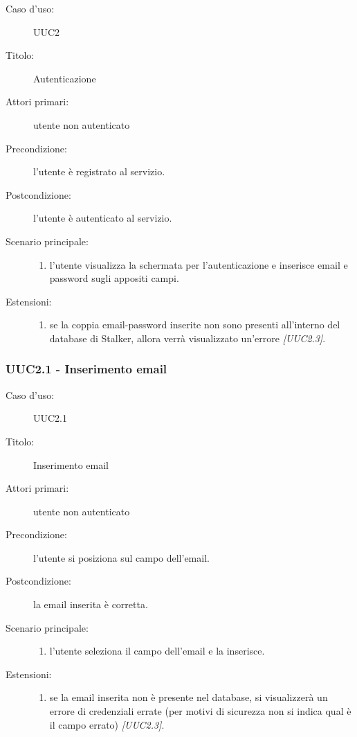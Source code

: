 \documentclass[../analisi-dei-requisiti.tex]{subfiles}
\begin{document}
\begin{description}
  \item[Caso d’uso:] UUC2
  \item[Titolo:] Autenticazione
  \item[Attori primari:] utente non autenticato
  \item[Precondizione:] l'utente è registrato al servizio.
  \item[Postcondizione:] l'utente è autenticato al servizio.
  \item[Scenario principale:]
  \begin{enumerate}
    \item l'utente visualizza la schermata per l'autenticazione e inserisce email e password sugli appositi campi.
  \end{enumerate}
  \item[Estensioni:]
  \begin{enumerate}
    \item se la coppia email-password inserite non sono presenti all'interno del database di Stalker, allora verrà visualizzato un'errore \emph{[UUC2.3]}.
  \end{enumerate}
\end{description}

\subsubsection{UUC2.1 - Inserimento email}%
\label{subsub:UUC2.1utente}
\begin{description}
  \item[Caso d’uso:] UUC2.1
  \item[Titolo:] Inserimento email
  \item[Attori primari:] utente non autenticato
  \item[Precondizione:] l'utente si posiziona sul campo dell'email.
  \item[Postcondizione:] la email inserita è corretta.
  \item[Scenario principale:]
  \begin{enumerate}
    \item l'utente seleziona il campo dell'email e la inserisce.
  \end{enumerate}
  \item[Estensioni:]
  \begin{enumerate}
    \item se la email inserita non è presente nel database, si visualizzerà un errore di credenziali errate (per motivi di sicurezza non si indica qual è il campo errato) \emph{[UUC2.3]}.
  \end{enumerate}
\end{description}
\end{document}
